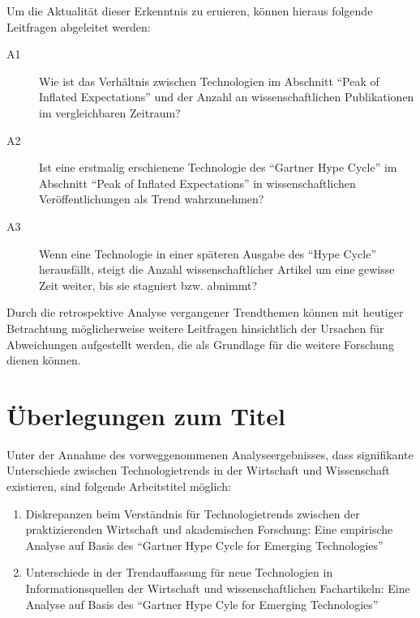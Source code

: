 Um die Aktualität dieser Erkenntnis zu eruieren, können hieraus folgende Leitfragen abgeleitet werden:

\begin{description}
	\item[A1] Wie ist das Verhältnis zwischen Technologien im Abschnitt "`Peak of Inflated Expectations"' und der Anzahl an wissenschaftlichen Publikationen im vergleichbaren Zeitraum?
\end{description}

\begin{description}
\item[A2] Ist eine erstmalig erschienene Technologie des "`Gartner Hype Cycle"' im Abschnitt "`Peak of Inflated Expectations"' in wissenschaftlichen Veröffentlichungen als Trend wahrzunehmen?
\end{description}

\begin{description}
	\item[A3] Wenn eine Technologie in einer späteren Ausgabe des "`Hype Cycle"' herausfällt, steigt die Anzahl wissenschaftlicher Artikel um eine gewisse Zeit weiter, bis sie stagniert bzw. abnimmt?
\end{description}

Durch die retrospektive Analyse vergangener Trendthemen können mit heutiger Betrachtung möglicherweise weitere Leitfragen hinsichtlich der Ursachen für Abweichungen aufgestellt werden, die als Grundlage für die weitere Forschung dienen können.

\section{Überlegungen zum Titel}
Unter der Annahme des vorweggenommenen Analyseergebnisses, dass signifikante Unterschiede zwischen Technologietrends in der Wirtschaft und Wissenschaft existieren, sind folgende Arbeitstitel möglich:
\begin{enumerate}
	\item Diskrepanzen beim Verständnis für Technologietrends zwischen der praktizierenden Wirtschaft und akademischen Forschung: Eine empirische Analyse auf Basis des "`Gartner Hype Cycle for Emerging Technologies"'
	\item Unterschiede in der Trendauffassung für neue Technologien in Informationsquellen der Wirtschaft und wissenschaftlichen Fachartikeln: Eine Analyse auf Basis des "`Gartner Hype Cyle for Emerging Technologies"'
\end{enumerate}

